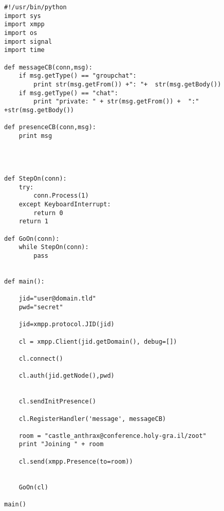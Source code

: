 \begin{verbatim}
#!/usr/bin/python
import sys
import xmpp
import os
import signal
import time

def messageCB(conn,msg):
	if msg.getType() == "groupchat":
		print str(msg.getFrom()) +": "+  str(msg.getBody())
	if msg.getType() == "chat":
		print "private: " + str(msg.getFrom()) +  ":" +str(msg.getBody())

def presenceCB(conn,msg):
	print msg




def StepOn(conn):
    try:
        conn.Process(1)
    except KeyboardInterrupt:
	    return 0
    return 1

def GoOn(conn):
    while StepOn(conn):
	    pass


def main():

	jid="user@domain.tld"
	pwd="secret"

	jid=xmpp.protocol.JID(jid)

	cl = xmpp.Client(jid.getDomain(), debug=[])

	cl.connect()

	cl.auth(jid.getNode(),pwd)


	cl.sendInitPresence()

	cl.RegisterHandler('message', messageCB)

	room = "castle_anthrax@conference.holy-gra.il/zoot"
	print "Joining " + room

	cl.send(xmpp.Presence(to=room))


	GoOn(cl)

main()
\end{verbatim}